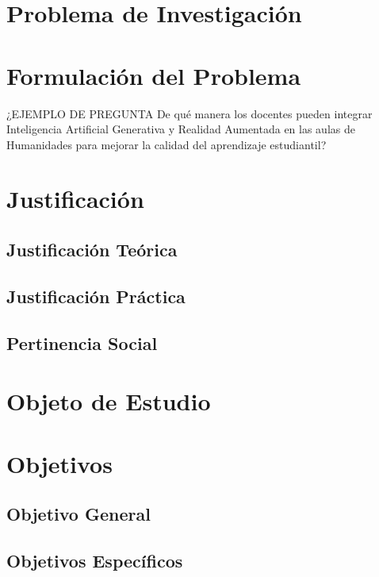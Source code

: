 \documentclass[11pt,oneside,letterpaper]{book}
\begin{document}
\section{Problema de Investigación}
\lipsum[1]

\section{Formulación del Problema}
¿EJEMPLO DE PREGUNTA De qué manera los docentes pueden integrar Inteligencia Artificial Generativa y Realidad Aumentada en las aulas de Humanidades para mejorar la calidad del aprendizaje estudiantil?

\section{Justificación}
\lipsum[1]

\subsection{Justificación Teórica}
\lipsum[1]

\subsection{Justificación Práctica}
\lipsum[1]

\subsection{Pertinencia Social}
\lipsum[1]

\section{Objeto de Estudio}
\lipsum[1]

\section{Objetivos}
\lipsum[1]

\subsection{Objetivo General}
\lipsum[1]

\subsection{Objetivos Específicos}
\lipsum[1]
\end{document}
